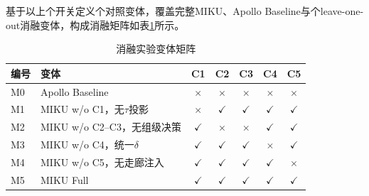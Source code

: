 \begin{table}[htbp]
\centering
\caption{MIKU算法的\AblationComponentTotal{}个正交组件}
\label{tab:ablation_components}
\small
{}
\end{table}

基于以上\AblationComponentTotal{}个开关定义\AblationVariantTotal{}个对照变体，覆盖完整MIKU、Apollo Baseline与\AblationLeaveOneOutVariantTotal{}个leave-one-out消融变体，构成消融矩阵如表\ref{tab:ablation_matrix}所示。

\begin{table}[htbp]
\centering
\caption{消融实验变体矩阵}
\label{tab:ablation_matrix}
\small
\begin{tabular}{llccccc}
\toprule
\textbf{编号} & \textbf{变体} & C1 & C2 & C3 & C4 & C5 \\
\midrule
M0 & Apollo Baseline                 & $\times$    & $\times$    & $\times$    & $\times$    & $\times$    \\
M1 & MIKU w/o C1，无$\tau$投影   & $\times$    & $\checkmark$ & $\checkmark$ & $\checkmark$ & $\checkmark$ \\
M2 & MIKU w/o C2--C3，无组级决策   & $\checkmark$ & $\times$    & $\times$    & $\checkmark$ & $\checkmark$ \\
M3 & MIKU w/o C4，统一$\delta$    & $\checkmark$ & $\checkmark$ & $\checkmark$ & $\times$    & $\checkmark$ \\
M4 & MIKU w/o C5，无走廊注入       & $\checkmark$ & $\checkmark$ & $\checkmark$ & $\checkmark$ & $\times$    \\
M5 & MIKU Full                       & $\checkmark$ & $\checkmark$ & $\checkmark$ & $\checkmark$ & $\checkmark$ \\
\bottomrule
\end{tabular}
\end{table}

